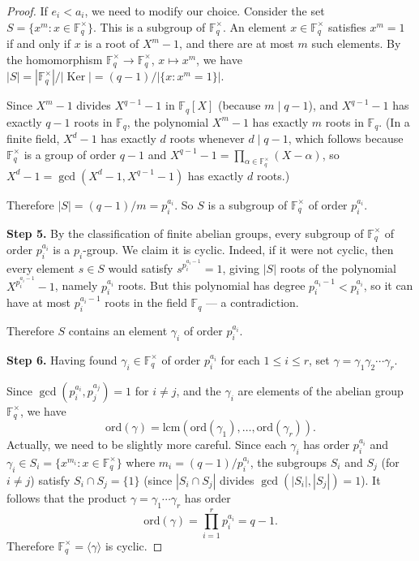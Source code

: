 \documentclass[12pt,a4paper,openany]{book}
\theoremstyle{definition}
\theoremstyle{remark}
\newcommand{\F}{\mathbb{F}}
\DeclareMathOperator{\Ker}{Ker}
\begin{document}
\begin{proof}
If $e_i < a_i$, we need to modify our choice. Consider the set
$S = \{ x^m : x \in \F_q^{\times} \}$. This is a subgroup of
$\F_q^{\times}$. An element $x \in \F_q^{\times}$ satisfies
$x^m = 1$ if and only if $x$ is a root of $X^m - 1$, and there are
at most $m$ such elements. By the homomorphism
$\F_q^{\times} \to \F_q^{\times}$, $x \mapsto x^m$, we have
$|S| = |\F_q^{\times}| / |\Ker| = (q-1)/|\{x : x^m = 1\}|$.

Since $X^m - 1$ divides $X^{q-1} - 1$ in $\F_q[X]$ (because
$m \mid q-1$), and $X^{q-1} - 1$ has exactly $q-1$ roots in
$\F_q$, the polynomial $X^m - 1$ has exactly $m$ roots in $\F_q$.
(In a finite field, $X^d - 1$ has exactly $d$ roots whenever
$d \mid q-1$, which follows because $\F_q^{\times}$ is a group of
order $q-1$ and $X^{q-1} - 1 = \prod_{\alpha \in \F_q^{\times}}
(X - \alpha)$, so $X^d - 1 = \gcd(X^d - 1, X^{q-1}-1)$ has exactly
$d$ roots.)

Therefore $|S| = (q-1)/m = p_i^{a_i}$. So $S$ is a subgroup of
$\F_q^{\times}$ of order $p_i^{a_i}$.

\textbf{Step 5.} By the classification of finite abelian groups,
every subgroup of $\F_q^{\times}$ of order $p_i^{a_i}$ is a
$p_i$-group. We claim it is cyclic. Indeed, if it were not cyclic,
then every element $s \in S$ would satisfy
$s^{p_i^{a_i - 1}} = 1$, giving $|S|$ roots of the polynomial
$X^{p_i^{a_i -1}} - 1$, namely $p_i^{a_i}$ roots. But this
polynomial has degree $p_i^{a_i - 1} < p_i^{a_i}$, so it can have
at most $p_i^{a_i-1}$ roots in the field $\F_q$ --- a
contradiction.

Therefore $S$ contains an element $\gamma_i$ of order $p_i^{a_i}$.

\textbf{Step 6.} Having found $\gamma_i \in \F_q^{\times}$ of order
$p_i^{a_i}$ for each $1 \le i \le r$, set
$\gamma = \gamma_1 \gamma_2 \cdots \gamma_r$.

Since $\gcd(p_i^{a_i}, p_j^{a_j}) = 1$ for $i \ne j$, and the
$\gamma_i$ are elements of the abelian group $\F_q^{\times}$, we have
\[
  \mathrm{ord}(\gamma) =
  \mathrm{lcm}(\mathrm{ord}(\gamma_1), \dots,
  \mathrm{ord}(\gamma_r)).
\]
Actually, we need to be slightly more careful. Since each $\gamma_i$
has order $p_i^{a_i}$ and $\gamma_i \in S_i = \{x^{m_i} : x \in
\F_q^{\times}\}$ where $m_i = (q-1)/p_i^{a_i}$, the subgroups
$S_i$ and $S_j$ (for $i \ne j$) satisfy $S_i \cap S_j = \{1\}$
(since $|S_i \cap S_j|$ divides $\gcd(|S_i|, |S_j|) = 1$). It
follows that the product $\gamma = \gamma_1 \cdots \gamma_r$ has
order
\[
  \mathrm{ord}(\gamma) = \prod_{i=1}^r p_i^{a_i} = q - 1.
\]
Therefore $\F_q^{\times} = \langle \gamma \rangle$ is cyclic.
\end{proof}
\end{document}
